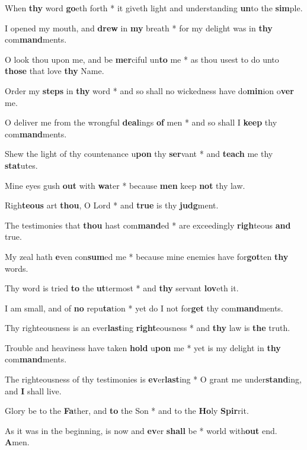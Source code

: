 \begin{multicols}{2}
	When \textbf{thy} word \textbf{go}eth forth * it giveth light and understanding \textbf{un}to the \textbf{sim}ple.
	
	I opened my mouth, and \textbf{drew} in \textbf{my} breath * for my delight was in \textbf{thy} com\textbf{mand}ments.
	
	O look thou upon me, and be \textbf{mer}ciful un\textbf{to} me * as thou usest to do unto \textbf{those} that love \textbf{thy} Name.
	
	Order my \textbf{steps} in \textbf{thy} word * and so shall no wickedness have do\textbf{min}ion o\textbf{ver} me.
	
	O deliver me from the wrongful \textbf{deal}ings \textbf{of} men * and so shall I \textbf{keep} thy com\textbf{mand}ments.
	
	Shew the light of thy countenance u\textbf{pon} thy \textbf{ser}vant * and \textbf{teach} me thy \textbf{stat}utes.
	
	Mine eyes gush \textbf{out} with \textbf{wa}ter * because \textbf{men} keep \textbf{not} thy law.
	
	Righ\textbf{teous} art \textbf{thou}, O Lord * and \textbf{true} is thy \textbf{judg}ment.
	
	The testimonies that \textbf{thou} hast com\textbf{mand}ed * are exceedingly \textbf{righ}teous \textbf{and} true.
	
	My zeal hath \textbf{e}ven con\textbf{sum}ed me * because mine enemies have for\textbf{got}ten \textbf{thy} words.
	
	Thy word is tried \textbf{to} the \textbf{ut}termost * and \textbf{thy} servant \textbf{lov}eth it.
	
	I am small, and of \textbf{no} repu\textbf{ta}tion * yet do I not for\textbf{get} thy com\textbf{mand}ments.
	
	Thy righteousness is an ever\textbf{last}ing \textbf{right}eousness * and \textbf{thy} law is \textbf{the} truth.
	
	Trouble and heaviness have taken \textbf{hold} u\textbf{pon} me * yet is my delight in \textbf{thy} com\textbf{mand}ments.
	
	The righteousness of thy testimonies is \textbf{ev}er\textbf{last}ing * O grant me under\textbf{stand}ing, and \textbf{I} shall live.
	
	Glory be to the \textbf{Fa}ther, and \textbf{to} the Son * and to the \textbf{Ho}ly \textbf{Spir}rit.
	
	As it was in the beginning, is now and \textbf{ev}er \textbf{shall} be * world with\textbf{out} end. \textbf{A}men.
\end{multicols}